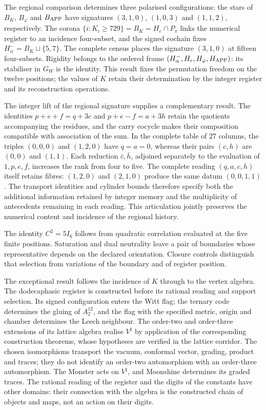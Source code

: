 The regional comparison determines three polarised configurations:
the stars of \(B_K\), \(B_\varphi\) and \(B_{\rm APP}\) have
signatures \((3,1,0)\), \((1,0,3)\) and \((1,1,2)\), respectively.
The corona \(\{i:K_i\geq729\}=B_K=H_e\cap P_\pi\) links
the numerical register to an incidence four-subset, and the signed
cochain fixes \(H^-_\alpha=B_K\sqcup\{5,7\}\).
The complete census places the signature \((3,1,0)\) at fifteen
four-subsets. Rigidity belongs to the ordered frame
\((H^-_\alpha,H_e,H_\varphi,H_{\rm APP})\): its stabiliser
in \(G_W\) is the identity. This result fixes the permutation
freedom on the twelve positions; the values of \(K\) retain
their determination by the integer register and its reconstruction
operations.

The integer lift of the regional signature supplies a complementary
result. The identities \(p+e+f=q+3c\) and \(p+e-f=a+3h\) retain
the quotients accompanying the residues, and the carry cocycle makes
their composition compatible with association of the sum.
In the complete table of \(27\) columns, the triples \((0,0,0)\)
and \((1,2,0)\) have \(q=a=0\), whereas their pairs \((c,h)\)
are \((0,0)\) and \((1,1)\). Each reduction \(\bar c,\bar h\),
adjoined separately to the evaluation of \(1,p,e,f\), increases
the rank from four to five. The complete reading \((q,a,c,h)\)
itself retains fibres: \((1,2,0)\) and \((2,1,0)\) produce the
same datum \((0,0,1,1)\). The transport identities and cylinder
bounds therefore specify both the additional information retained
by integer memory and the multiplicity of antecedents remaining
in each reading. This articulation jointly preserves the numerical
content and incidence of the regional history.



The identity \(C^2=5I_6\) follows from quadratic correlation evaluated
at the five finite positions. Saturation and dual neutrality leave a
pair of boundaries whose representative depends on the declared
orientation. Closure controls distinguish that selection from variations
of the boundary and of register position. 

The exceptional result follows the incidence of \(K\) through to the
vertex algebra. The dodecaphasic register is constructed before its
rational reading and support selection. Its signed configuration enters
the Witt flag; the ternary code determines the gluing of \(A_2^{12}\),
and the flag with the specified metric, origin and chamber determines
the Leech neighbour. The order-two and order-three extensions of its
lattice algebra realise \(V^\natural\) by application of the
corresponding construction theorems, whose hypotheses are verified
in the lattice corridor. The chosen isomorphisms transport the vacuum,
conformal vector, grading, product and traces; they do not identify an
order-two automorphism with an order-three automorphism. The Monster
acts on \(V^\natural\), and Moonshine determines its graded traces.
The rational reading of the register and the digits of the constants
have other domains: their connection with the algebra is the constructed
chain of objects and maps, not an action on their digits.

